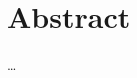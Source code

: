 \documentclass[../thesis.tex]{subfiles}
\begin{document}
\chapter*{Abstract}
\lipsum[1-2]
\ldots
\end{document}
